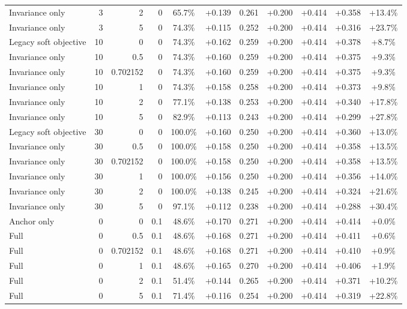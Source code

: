 \begin{table}[htbp]
\begin{tabular}{lrrrccccccc}
Invariance only & 3 & 2 & 0 & 65.7\% & +0.139 & 0.261 & +0.200 & +0.414 & +0.358 & +13.4\% \\
Invariance only & 3 & 5 & 0 & 74.3\% & +0.115 & 0.252 & +0.200 & +0.414 & +0.316 & +23.7\% \\
Legacy soft objective & 10 & 0 & 0 & 74.3\% & +0.162 & 0.259 & +0.200 & +0.414 & +0.378 & +8.7\% \\
Invariance only & 10 & 0.5 & 0 & 74.3\% & +0.160 & 0.259 & +0.200 & +0.414 & +0.375 & +9.3\% \\
Invariance only & 10 & 0.702152 & 0 & 74.3\% & +0.160 & 0.259 & +0.200 & +0.414 & +0.375 & +9.3\% \\
Invariance only & 10 & 1 & 0 & 74.3\% & +0.158 & 0.258 & +0.200 & +0.414 & +0.373 & +9.8\% \\
Invariance only & 10 & 2 & 0 & 77.1\% & +0.138 & 0.253 & +0.200 & +0.414 & +0.340 & +17.8\% \\
Invariance only & 10 & 5 & 0 & 82.9\% & +0.113 & 0.243 & +0.200 & +0.414 & +0.299 & +27.8\% \\
Legacy soft objective & 30 & 0 & 0 & 100.0\% & +0.160 & 0.250 & +0.200 & +0.414 & +0.360 & +13.0\% \\
Invariance only & 30 & 0.5 & 0 & 100.0\% & +0.158 & 0.250 & +0.200 & +0.414 & +0.358 & +13.5\% \\
Invariance only & 30 & 0.702152 & 0 & 100.0\% & +0.158 & 0.250 & +0.200 & +0.414 & +0.358 & +13.5\% \\
Invariance only & 30 & 1 & 0 & 100.0\% & +0.156 & 0.250 & +0.200 & +0.414 & +0.356 & +14.0\% \\
Invariance only & 30 & 2 & 0 & 100.0\% & +0.138 & 0.245 & +0.200 & +0.414 & +0.324 & +21.6\% \\
Invariance only & 30 & 5 & 0 & 97.1\% & +0.112 & 0.238 & +0.200 & +0.414 & +0.288 & +30.4\% \\
Anchor only & 0 & 0 & 0.1 & 48.6\% & +0.170 & 0.271 & +0.200 & +0.414 & +0.414 & +0.0\% \\
Full & 0 & 0.5 & 0.1 & 48.6\% & +0.168 & 0.271 & +0.200 & +0.414 & +0.411 & +0.6\% \\
Full & 0 & 0.702152 & 0.1 & 48.6\% & +0.168 & 0.271 & +0.200 & +0.414 & +0.410 & +0.9\% \\
Full & 0 & 1 & 0.1 & 48.6\% & +0.165 & 0.270 & +0.200 & +0.414 & +0.406 & +1.9\% \\
Full & 0 & 2 & 0.1 & 51.4\% & +0.144 & 0.265 & +0.200 & +0.414 & +0.371 & +10.2\% \\
Full & 0 & 5 & 0.1 & 71.4\% & +0.116 & 0.254 & +0.200 & +0.414 & +0.319 & +22.8\% \\

\end{tabular}
\end{table}
